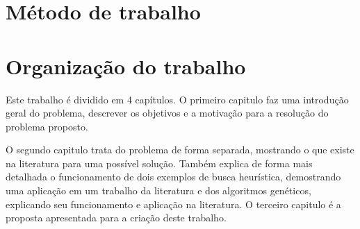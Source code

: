 \section{Método de trabalho}

\section{Organização do trabalho}
Este trabalho é dividido em 4 capítulos. O primeiro capitulo faz uma introdução geral do problema, descrever os objetivos e a motivação para a resolução do problema proposto.

O segundo capitulo trata do problema de forma separada, mostrando o que existe na literatura para uma possível solução. Também explica de forma mais detalhada o funcionamento de dois exemplos de busca heurística, demostrando uma aplicação em um trabalho da literatura e dos algoritmos genéticos, explicando seu funcionamento e aplicação na literatura.
O terceiro capitulo é a proposta apresentada para a criação deste trabalho.


